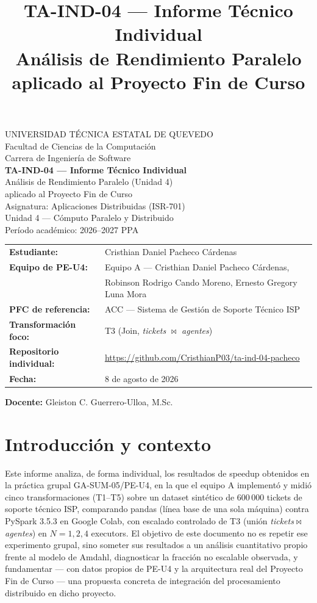 \documentclass[11pt]{article}
\title{TA-IND-04 --- Informe Técnico Individual\\
\large Análisis de Rendimiento Paralelo aplicado al Proyecto Fin de Curso}
\author{}
\date{}
\begin{document}
\begin{titlepage}
\centering
{\large UNIVERSIDAD TÉCNICA ESTATAL DE QUEVEDO}\\
Facultad de Ciencias de la Computación\\
Carrera de Ingeniería de Software\\[1.5em]

{\Large\bf TA-IND-04 --- Informe Técnico Individual}\\[0.3em]
{\large Análisis de Rendimiento Paralelo (Unidad 4)\\
aplicado al Proyecto Fin de Curso}\\[1.5em]

Asignatura: Aplicaciones Distribuidas (ISR-701)\\
Unidad 4 --- Cómputo Paralelo y Distribuido\\
Período académico: 2026--2027 PPA\\[2em]

\begin{tabular}{ll}
\textbf{Estudiante:} & Cristhian Daniel Pacheco Cárdenas \\
\textbf{Equipo de PE-U4:} & Equipo A --- Cristhian Daniel Pacheco Cárdenas, \\
 & Robinson Rodrigo Cando Moreno, Ernesto Gregory Luna Mora \\
\textbf{PFC de referencia:} & ACC --- Sistema de Gestión de Soporte Técnico ISP \\
\textbf{Transformación foco:} & T3 (Join, \emph{tickets} $\bowtie$ \emph{agentes}) \\
\textbf{Repositorio individual:} & \url{https://github.com/CristhianP03/ta-ind-04-pacheco} \\
\textbf{Fecha:} & 8 de agosto de 2026 \\
\end{tabular}

\vfill
\textbf{Docente:} Gleiston C. Guerrero-Ulloa, M.Sc.
\end{titlepage}

\section{Introducción y contexto}

Este informe analiza, de forma individual, los resultados de speedup
obtenidos en la práctica grupal GA-SUM-05/PE-U4, en la que el equipo A
implementó y midió cinco transformaciones (T1--T5) sobre un dataset
sintético de 600\,000 tickets de soporte técnico ISP, comparando pandas
(línea base de una sola máquina) contra PySpark 3.5.3 en Google Colab,
con escalado controlado de T3 (unión \emph{tickets}$\bowtie$\emph{agentes})
en $N=1,2,4$ executors. El objetivo de este documento no es repetir ese
experimento grupal, sino someter sus resultados a un análisis
cuantitativo propio frente al modelo de Amdahl, diagnosticar la fracción
no escalable observada, y fundamentar --- con datos propios de PE-U4 y
la arquitectura real del Proyecto Fin de Curso --- una propuesta
concreta de integración del procesamiento distribuido en dicho proyecto.
\end{document}
